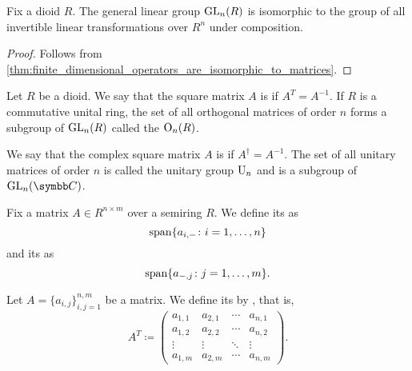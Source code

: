 \begin{proposition}\label{def:general_linear_group_isomorphic_to_automorphism_group}
  Fix a dioid \( R \). The general linear group \( \operatorname{GL}_n(R) \) is isomorphic to the group of all invertible linear transformations over \( R^n \) under composition.
\end{proposition}
\begin{proof}
  Follows from \cref{thm:finite_dimensional_operators_are_isomorphic_to_matrices}.
\end{proof}

\begin{definition}\label{def:orthogonal_matrix}
  Let \( R \) be a dioid. We say that the square matrix \( A \) is  if \( A^T = A^{-1} \). If \( R \) is a commutative unital ring, the set of all orthogonal matrices of order \( n \) forms a subgroup of \( \operatorname{GL}_n(R) \) called the  \( \operatorname{O}_n(R) \).
\end{definition}

\begin{definition}\label{def:unitary_matrix}
  We say that the complex square matrix \( A \) is  if \( A^\dagger = A^{-1} \). The set of all unitary matrices of order \( n \) is called the unitary group \( \operatorname{U}_n \) and is a subgroup of \( \GL_n(\Co) \).
\end{definition}

\begin{definition}\label{def:matrix_column_and_row_space}
  Fix a matrix \( A \in R^{n \times m} \) over a semiring \( R \). We define its  as
  \begin{equation*}
    \operatorname{span} \{ a_{i,-} \colon i = 1, \ldots, n \}
  \end{equation*}
  and its  as
  \begin{equation*}
    \operatorname{span} \{ a_{-,j} \colon j = 1, \ldots, m \}.
  \end{equation*}
\end{definition}

\begin{definition}\label{def:matrix_transpose}
  Let \( A = \{ a_{i,j} \}_{i,j=1}^{n,m} \) be a matrix. We define its  by , that is,
  \begin{equation*}
    A^T \coloneqq \begin{pmatrix}
      a_{1,1} & a_{2,1} & \cdots & a_{n,1} \\
      a_{1,2} & a_{2,2} & \cdots & a_{n,2} \\
      \vdots  & \vdots  & \ddots & \vdots \\
      a_{1,m} & a_{2,m} & \cdots & a_{n,m}
    \end{pmatrix}.
  \end{equation*}
\end{definition}

